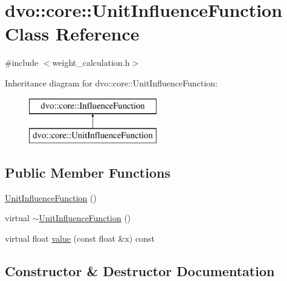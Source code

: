 \hypertarget{classdvo_1_1core_1_1_unit_influence_function}{}\section{dvo\+:\+:core\+:\+:Unit\+Influence\+Function Class Reference}
\label{classdvo_1_1core_1_1_unit_influence_function}


{\ttfamily \#include $<$weight\+\_\+calculation.\+h$>$}

Inheritance diagram for dvo\+:\+:core\+:\+:Unit\+Influence\+Function\+:\begin{figure}[H]
\begin{center}
\leavevmode
\includegraphics[height=2.000000cm]{classdvo_1_1core_1_1_unit_influence_function}
\end{center}
\end{figure}
\subsection*{Public Member Functions}
\begin{DoxyCompactItemize}
\item 
\mbox{\hyperlink{classdvo_1_1core_1_1_unit_influence_function_ae311eee27c2c13cb271c8c16abaf84fb}{Unit\+Influence\+Function}} ()
\item 
virtual \mbox{\hyperlink{classdvo_1_1core_1_1_unit_influence_function_a1d72e24e73a9b8ca22edadded2dcfe3b}{$\sim$\+Unit\+Influence\+Function}} ()
\item 
virtual float \mbox{\hyperlink{classdvo_1_1core_1_1_unit_influence_function_a889eacebc6bcb0209a8ce37742dbbe71}{value}} (const float \&x) const
\end{DoxyCompactItemize}


\subsection{Constructor \& Destructor Documentation}
\mbox{\label{classdvo_1_1core_1_1_unit_influence_function_ae311eee27c2c13cb271c8c16abaf84fb}} 
